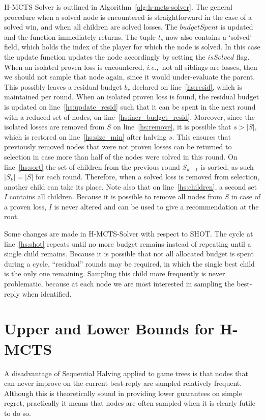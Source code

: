 \documentclass{kecsmstr}
\newcommand{\ie}{{\it i.e.,}~}
\newcommand{\func}[1]{{\sc #1}}
\begin{document}
\DecMargin{1em}
\newpage
H-MCTS Solver is outlined in Algorithm~\ref{alg:h-mcts-solver}. The general procedure when a solved node is encountered is straightforward in the case of a solved win, and when all children are solved losses. The $budgetSpent$ is updated and the function immediately returns. The tuple $t_s$ now also contains a `solved' field, which holds the index of the player for which the node is solved. In this case the \func{update} function updates the node accordingly by setting the $isSolved$ flag. When an isolated proven loss is encountered, \ie not all siblings are losses, then we should not sample that node again, since it would under-evaluate the parent. This possibly leaves a residual budget $b_r$ declared on line~\ref{hs:resid}, which is maintained per round. When an isolated proven loss is found, the residual budget is updated on line~\ref{hs:update_resid} such that it can be spent in the next round with a reduced set of nodes, on line~\ref{hs:incr_budget_resid}. Moreover, since the isolated losses are removed from $S$ on line~\ref{hs:remove}, it is possible that $s > |S|$, which is restored on line~\ref{hs:size_min} after halving $s$. This ensures that previously removed nodes that were not proven losses can be returned to selection in case more than half of the nodes were solved in this round. On line~\ref{hs:sort} the set of children from the previous round $S_{k-1}$ is sorted, as such $|S_k| = |S|$ for each round. Therefore, when a solved loss is removed from selection, another child can take its place. Note also that on line~\ref{hs:children}, a second set $I$ contains all children. Because it is possible to remove all nodes from $S$ in case of a proven loss, $I$ is never altered and can be used to give a recommendation at the root.

Some changes are made in H-MCTS-Solver with respect to SHOT. The cycle at line~\ref{hs:shot} repeats until no more budget remains instead of repeating until a single child remains. Because it is possible that not all allocated budget is spent during a cycle, ``residual'' rounds may be required, in which the single best child is the only one remaining. Sampling this child more frequently is never problematic, because at each node we are most interested in sampling the best-reply when identified.

\newpage
\section{Upper and Lower Bounds for H-MCTS}
\label{sec:ulb_h-mcts}
A disadvantage of Sequential Halving applied to game trees is that nodes that can never improve on the current best-reply are sampled relatively frequent. Although this is theoretically sound in providing lower guarantees on simple regret, practically it means that nodes are often sampled when it is clearly futile to do so. 
\end{document}
